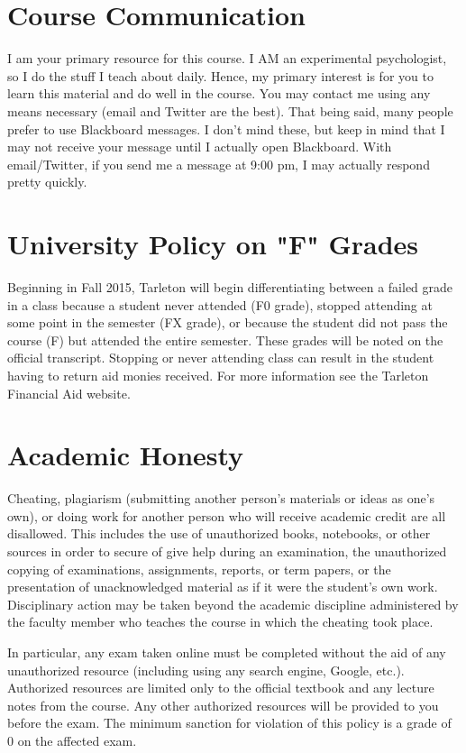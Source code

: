 \documentclass[10pt]{article}
\begin{document}
\section*{Course Communication}
\label{sec-6}

I am your primary resource for this course. I AM an experimental psychologist, so I do the stuff I teach about daily. Hence, my primary interest is for you to learn this material and do well in the course. You may contact me using any means necessary (email and Twitter are the best). That being said, many people prefer to use Blackboard messages. I don’t mind these, but keep in mind that I may not receive your message until I actually open Blackboard. With email/Twitter, if you send me a message at 9:00 pm, I may actually respond pretty quickly. 

\section*{University Policy on "F" Grades}
\label{sec-7}

Beginning in Fall 2015, Tarleton will begin differentiating between a failed grade in a class because a student never attended (F0 grade), stopped attending at some point in the semester (FX grade), or because the student did not pass the course (F) but attended the entire semester. These grades will be noted on the official transcript. Stopping or never attending class can result in the student having to return aid monies received.  For more information see the Tarleton Financial Aid website.

\section*{Academic Honesty}
\label{sec-8}

Cheating, plagiarism (submitting another person’s materials or ideas as one’s own), or doing work for another person who will receive academic credit are all disallowed. This includes the use of unauthorized books, notebooks, or other sources in order to secure of give help during an examination, the unauthorized copying of examinations, assignments, reports, or term papers, or the presentation of unacknowledged material as if it were the student’s own work. Disciplinary action may be taken beyond the academic discipline administered by the faculty member who teaches the course in which the cheating took place.

In particular, any exam taken online must be completed without the aid of any unauthorized resource (including using any search engine, Google, etc.).  Authorized resources are limited only to the official textbook and any lecture notes from the course.  Any other authorized resources will be provided to you before the exam.  The minimum sanction for violation of this policy is a grade of 0 on the affected exam.
\end{document}
